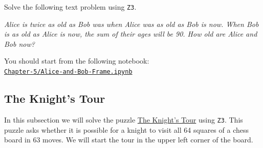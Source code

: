 \exerciseEng
Solve the following text problem using \texttt{Z3}.

\begin{minipage}[b]{0.9\linewidth}
\textsl{Alice is twice as old as Bob was when Alice was as old as Bob is now. When Bob is as old as Alice is now, the sum of their ages will be 90. How old are Alice and Bob now?}
\end{minipage}

\noindent
You should start from the following notebook:
\\[0.2cm]
\hspace*{0.8cm}
\href{https://github.com/karlstroetmann/Logic/blob/master/Java/Chapter-5/Alice-and-Bob-Frame.ipynb}{\texttt{Chapter-5/Alice-and-Bob-Frame.ipynb}}
\eox

\subsection{The Knight's Tour}
In this subsection we will solve the puzzle \href{https://en.wikipedia.org/wiki/Knight%27s_tour}{The Knight's Tour} 
using \texttt{Z3}.  This puzzle asks whether it is possible for a knight to visit all 64 squares of a chess board
in 63 moves.  We will start the tour in the upper left corner of the board.  

